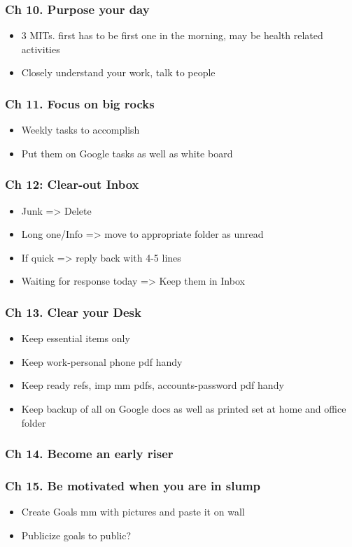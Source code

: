 \begin{frame}[fragile]
\frametitle{Ch 10. Purpose your day}
\begin{itemize}
\item 3 MITs. first has to be first one in the morning, may be health related activities
\item Closely understand your work, talk to people
\end{itemize}
\end{frame}

\begin{frame}[fragile]
\frametitle{Ch 11. Focus on big rocks}
\begin{itemize}
\item Weekly tasks to accomplish
\item Put them on Google tasks as well as white board
\end{itemize}
\end{frame}

\begin{frame}[fragile]
\frametitle{Ch 12: Clear-out Inbox}
\begin{itemize}
\item Junk => Delete
\item Long one/Info => move to appropriate folder as unread
\item If quick => reply back with 4-5 lines
\item Waiting for response today => Keep them in Inbox
\end{itemize}
\end{frame}

\begin{frame}[fragile]
\frametitle{Ch 13. Clear your Desk}
\begin{itemize}
\item Keep essential items only
\item Keep work-personal phone pdf handy
\item Keep ready refs, imp mm pdfs, accounts-password pdf handy
\item Keep backup of all on Google docs as well as printed set at home and office folder
\end{itemize}
\end{frame}

\begin{frame}[fragile]
\frametitle{Ch 14. Become an early riser}
\end{frame}

\begin{frame}[fragile]
\frametitle{Ch 15. Be motivated when you are in slump}
\begin{itemize}
\item Create Goals mm with pictures and paste it on wall
\item Publicize goals to public?
\end{itemize}
\end{frame}

